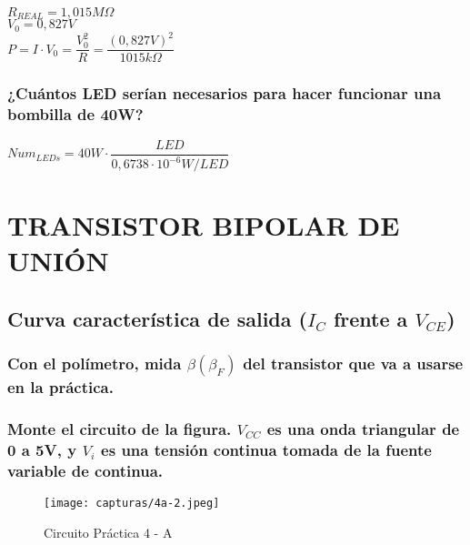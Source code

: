 $ R_{REAL} = 1,015 M\Omega $
\\

$ V_{0} = 0,827 V $
\\

$ P = I\cdot V_{0} = \dfrac{V_{0}^{2}}{R} = \dfrac{(0,827V)^{2}}{1015k \Omega} $ \hspace{4pt} \fboxrule=1pt \fboxsep=6pt

\subsubsection{¿Cuántos LED serían necesarios para hacer funcionar una
	bombilla de 40W?}

$ Num_{LEDs} = 40 W \cdot \dfrac{LED}{0,6738 \cdot 10^{-6} W/LED} $ \hspace{4pt} \fboxrule=1pt \fboxsep=6pt

\newpage

\section{TRANSISTOR BIPOLAR DE UNIÓN}

\subsection{Curva característica de salida ($ I_{C} $ frente a $ V_{CE} $)}

\subsubsection{Con el polímetro, mida $ \beta (\beta_{F}) $ del transistor que va a usarse
	en la práctica.}

\begin{center}
	\fboxrule=1pt \fboxsep=6pt
\end{center}


\subsubsection{Monte el circuito de la figura. $ V_{CC} $ es una onda
triangular de 0 a 5V, y $ V_{i} $ es una tensión continua tomada de
la fuente variable de continua.}

\begin{figure}[H] %
	\centering
	\texttt{[image: capturas/4a-2.jpeg]} 
	\caption{Circuito Práctica 4 - A}
	\label{fig:4a-2}
\end{figure}

